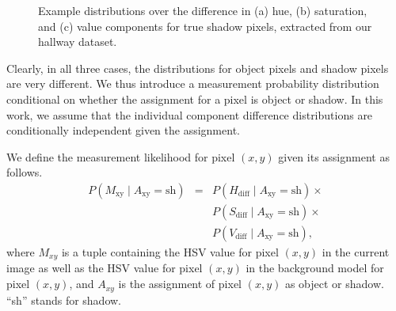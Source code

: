 \begin{figure}[t]
  \caption[Example distributions over the difference in hue,
    saturation, and value components for true shadow pixels, extracted
    from our hallway dataset.]{\small Example distributions over the
    difference in (a) hue, (b) saturation, and (c) value components
    for true shadow pixels, extracted from our hallway dataset.}
  \label{fig:shadow-distribution}
\end{figure}

Clearly, in all three cases, the distributions for object pixels and
shadow pixels are very different.  We thus introduce a measurement
probability distribution conditional on whether the assignment for a
pixel is object or shadow. In this work, we assume that the individual
component difference distributions are conditionally independent given
the assignment.

We define the measurement likelihood for pixel $(x, y)$ given its
assignment as follows.
\begin{equation}
  \label{eq:shadow-measurement}
  \begin{array}{ccl}
    P(M_{\text{xy}} \mid A_{\text{xy}} = \text{sh}) 
            & = & P(H_{\text{diff}} \mid A_{\text{xy}} = \text{sh}) \times \\
            &   & P(S_{\text{diff}} \mid A_{\text{xy}} = \text{sh}) \times \\
            &   & P(V_{\text{diff}} \mid A_{\text{xy}} = \text{sh}),
  \end{array}
\end{equation}
where $M_{xy}$ is a tuple containing the HSV value for pixel $(x,y)$
in the current image as well as the HSV value for pixel $(x,y)$ in the
background model for pixel $(x,y)$, and $A_{xy}$ is the assignment of
pixel $(x,y)$ as object or shadow. ``sh'' stands for shadow.

